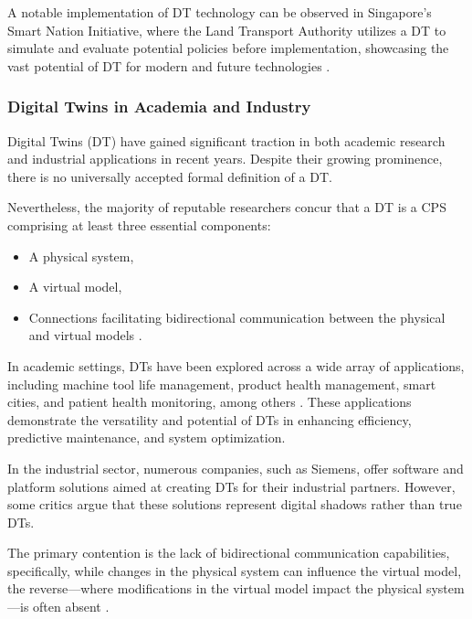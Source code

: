 A notable implementation of \ac{DT} technology can be observed in Singapore's Smart Nation Initiative, where the Land Transport Authority 
utilizes a \ac{DT} to simulate and evaluate potential policies before implementation, showcasing the vast potential of \ac{DT} for modern and 
future technologies \cite{isprs-archives-XLII-4-W7-37-2017}.

\subsubsection{Digital Twins in Academia and Industry}

Digital Twins (DT) have gained significant traction in both academic research and industrial applications in recent years. Despite their growing prominence,
there is no universally accepted formal definition of a DT. 

Nevertheless, the majority of reputable researchers concur that a DT is a \ac{CPS} comprising at
least three essential components: 
\begin{itemize}
    \item A physical system,
    \item A virtual model,
    \item Connections facilitating bidirectional communication between the physical and virtual models \cite{TaoFei, 8477101, ROSEN2015567}.
\end{itemize}

In academic settings, DTs have been explored across a wide array of applications, including machine tool life management, product health management,
smart cities, and patient health monitoring, among others \cite{8361285, TAO2018169, isprs-archives-XLII-4-W7-37-2017, 10.1007/978-3-030-23162-0_19, 6296978}. These applications demonstrate the versatility and potential of DTs in enhancing efficiency, predictive maintenance, and system optimization. 

In the industrial sector, numerous companies, such as Siemens, offer software and platform solutions aimed at creating DTs for their industrial partners. 
However, some critics argue that these solutions represent digital shadows rather than true DTs. 

The primary contention is the lack of bidirectional communication capabilities, specifically, while changes in the physical system can influence the virtual model, the reverse—where modifications in the virtual model impact the physical system—is often absent \cite{CIMINO2019103130}. 

